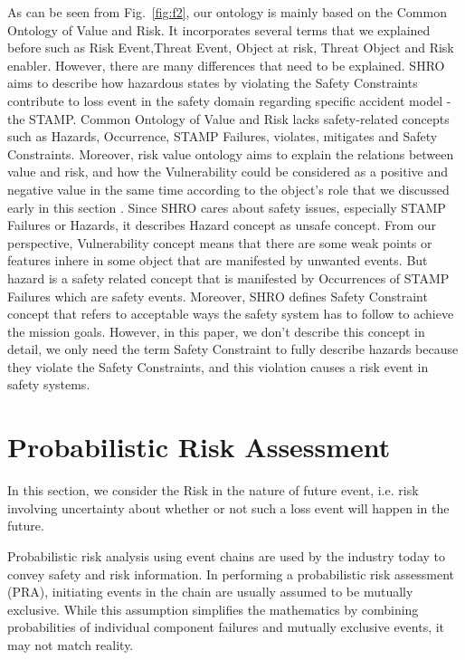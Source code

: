 \documentclass[sw]{iosart2x}
\newcommand{\term}[1]{\textnormal{\textsf{#1}}}
\begin{document}
As can be seen from Fig.~\ref{fig:f2}, our ontology is mainly based on the Common Ontology of Value and Risk. It incorporates several terms that we explained before such as \term{Risk Event},\term{Threat Event}, \term{Object at risk}, \term{Threat Object} and \term{Risk enabler}. However, there are many differences that need to be explained. SHRO aims to describe how hazardous states by violating the \term{Safety Constraints} contribute to loss event in the safety domain regarding specific accident model - the STAMP. Common Ontology of Value and Risk lacks safety-related concepts such as \term{Hazards}, \term{Occurrence}, \term{STAMP Failures}, \term{violates}, \term{mitigates} and \term{Safety Constraints}. Moreover, risk value ontology aims to explain the relations between value and risk, and how the \term {Vulnerability} could be considered as a positive and negative value in the same time according to the object's role that we discussed early in this section \cite{unknown}. Since SHRO cares about safety issues, especially \term{STAMP Failures} or \term{Hazards}, it describes \term{Hazard} concept as unsafe concept. From our perspective, \term{Vulnerability} concept means that there are some weak points or features inhere in some object that are manifested by unwanted events. But hazard is a safety related concept that is manifested by \term{Occurrences} of \term{STAMP Failures} which are safety events.
Moreover, SHRO defines \term{Safety Constraint} concept that refers to acceptable ways the safety system has to follow to achieve the mission goals. However, in this paper, we don't describe this concept in detail, we only need the term \term{Safety Constraint} to fully describe hazards because they violate the \term{Safety Constraints}, and this violation causes a risk event in safety systems.
\section{Probabilistic Risk Assessment}
\label{sec:future}
In this section, we consider the \term{Risk} in the nature of future event, i.e. risk involving uncertainty about whether or not such a loss event will happen in the future. 

Probabilistic risk analysis using event chains are used by the industry today to convey safety and risk information. In performing a probabilistic risk assessment (PRA), initiating events in the chain are usually assumed to be mutually exclusive. While this assumption simplifies the mathematics by combining probabilities of individual
component failures and mutually exclusive events, it may not match reality.
\end{document}
